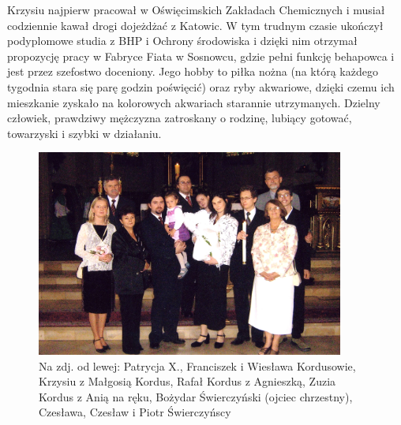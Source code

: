 Krzysiu najpierw pracował w Oświęcimskich Zakładach Chemicznych i musiał codziennie kawał drogi dojeżdżać z Katowic. W tym trudnym czasie ukończył podyplomowe studia z BHP i Ochrony środowiska i dzięki nim otrzymał propozycję pracy w Fabryce Fiata w Sosnowcu, gdzie pełni funkcję behapowca i jest przez szefostwo doceniony. Jego hobby to piłka nożna (na którą każdego tygodnia stara się parę godzin poświęcić) oraz ryby akwariowe, dzięki czemu ich mieszkanie zyskało na kolorowych akwariach starannie utrzymanych. Dzielny człowiek, prawdziwy mężczyzna zatroskany o rodzinę, lubiący gotować, towarzyski i szybki w działaniu.
\begin{figure}[!h]
\begin{center}
\includegraphics[width=0.9\textwidth]{photo/ania_kordus_chrzest.jpg}
\caption[Chrzest Ani Kordus]{Na zdj. od lewej: Patrycja X., Franciszek i Wiesława Kordusowie, Krzysiu z Małgosią Kordus, Rafał Kordus z Agnieszką, Zuzia Kordus z Anią na ręku, Bożydar Świerczyński (ojciec chrzestny), Czesława, Czesław i Piotr Świerczyńscy}
\end{center}
\end{figure}

